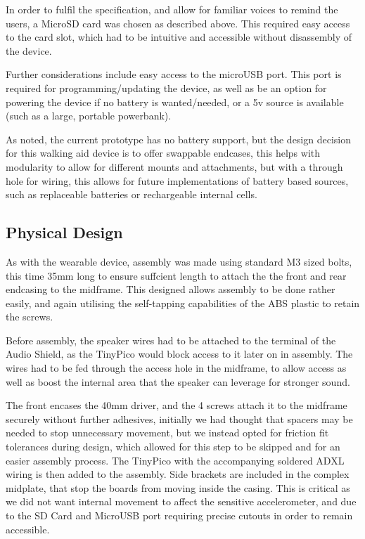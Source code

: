             In order to fulfil the specification, and allow for familiar voices to remind the users, a MicroSD card was chosen as described above. This required easy access to the card slot, which had to be intuitive and accessible without disassembly of the device.

            

            Further considerations include easy access to the microUSB port. This port is required for programming/updating the device, as well as be an option for powering the device if no battery is wanted/needed, or a 5v source is available (such as a large, portable powerbank).

            As noted, the current prototype has no battery support, but the design decision for this walking aid device is to offer swappable endcases, this helps with modularity to allow for different mounts and attachments, but with a through hole for wiring, this allows for future implementations of battery based sources, such as replaceable batteries or rechargeable internal cells.


        \subsection{Physical Design}
        \label{subsec:prototype_walking_aid}

            As with the wearable device, assembly was made using standard M3 sized bolts, this time 35mm long to ensure suffcient length to attach the the front and rear endcasing to the midframe. This designed allows assembly to be done rather easily, and again utilising the self-tapping capabilities of the ABS plastic to retain the screws.

            Before assembly, the speaker wires had to be attached to the terminal of the Audio Shield, as the TinyPico would block access to it later on in assembly. The wires had to be fed through the access hole in the midframe, to allow access as well as boost the internal area that the speaker can leverage for stronger sound.

            The front encases the 40mm driver, and the 4 screws attach it to the midframe securely without further adhesives, initially we had thought that spacers may be needed to stop unnecessary movement, but we instead opted for friction fit tolerances during design, which allowed for this step to be skipped and for an easier assembly process. The TinyPico with the accompanying soldered ADXL wiring is then added to the assembly. Side brackets are included in the complex midplate, that stop the boards from moving inside the casing. This is critical as we did not want internal movement to affect the sensitive accelerometer, and due to the SD Card and MicroUSB port requiring precise cutouts in order to remain accessible.

